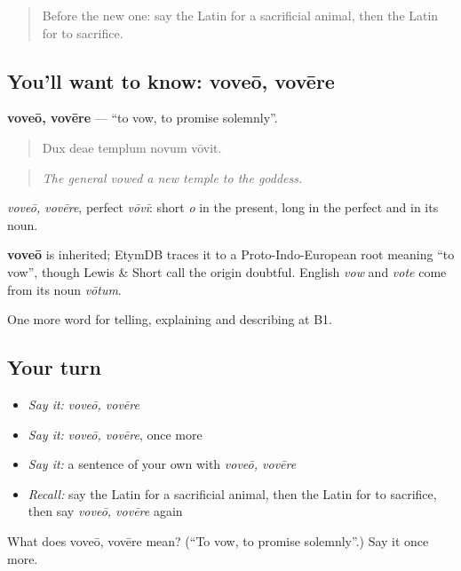 \begin{quote}
Before the new one: say the Latin for a sacrificial animal, then the Latin for to sacrifice.
\end{quote}

\subsection*{You'll want to know: voveō, vovēre}
\textbf{voveō, vovēre} — \textquotedblleft{}to vow, to promise solemnly\textquotedblright{}.

\begin{quote}
Dux deae templum novum vōvit.
\end{quote}

\begin{quote}
\emph{The general vowed a new temple to the goddess.}
\end{quote}

\emph{voveō, vovēre}, perfect \emph{vōvī}: short \emph{o} in the present, long in the perfect and in its noun.

\begin{cousinweb}
\textbf{voveō} is inherited; EtymDB traces it to a Proto-Indo-European root meaning \textquotedblleft{}to vow\textquotedblright{}, though Lewis \& Short call the origin doubtful. English \emph{vow} and \emph{vote} come from its noun \emph{vōtum}.
\end{cousinweb}

\begin{grammarlens}[title={What you've built}]
One more word for telling, explaining and describing at B1.
\end{grammarlens}

\subsection*{Your turn}
\begin{itemize}
\raggedright
  \item \emph{Say it:} \emph{voveō, vovēre}
  \item \emph{Say it:} \emph{voveō, vovēre}, once more
  \item \emph{Say it:} a sentence of your own with \emph{voveō, vovēre}
  \item \emph{Recall:} say the Latin for a sacrificial animal, then the Latin for to sacrifice, then say \emph{voveō, vovēre} again
\end{itemize}

\begin{tcolorbox}[breakable,colback=teal!4,colframe=teal!35!black,title={Before you move on}]
What does voveō, vovēre mean? (\textquotedblleft{}To vow, to promise solemnly\textquotedblright{}.) Say it once more.
\end{tcolorbox}
